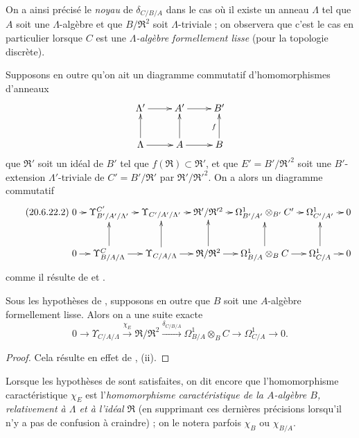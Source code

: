 On a ainsi précisé le \emph{noyau} de $\delta_{C/B/A}$ dans le cas où il
existe un anneau $\Lambda$ tel que $A$ soit une $\Lambda$-algèbre et que
$B/\mathfrak{R}^2$ soit $\Lambda$-triviale ; on observera que c'est le cas
en particulier lorsque $C$ est une \emph{$\Lambda$-algèbre formellement
lisse} (pour la topologie discrète).

Supposons en outre qu'on ait un diagramme commutatif d'homomorphismes
d'anneaux
\[
\xymatrix{
  \Lambda' \ar[r] & A' \ar[r] & B' \\
  \Lambda \ar[u] \ar[r] & A \ar[u] \ar[r] & B \ar[u]^f
}
\]
que $\mathfrak{R}'$ soit un idéal de $B'$ tel que
$f(\mathfrak{R})\subset\mathfrak{R}'$, et que
$E'=B'/\mathfrak{R}'^2$ soit une $B'$-extension $\Lambda'$-triviale de
$C'=B'/\mathfrak{R}'$ par $\mathfrak{R}'/\mathfrak{R}'^2$. On a alors un
diagramme commutatif
\begin{equation}
\tag{20.6.22.2}
\label{0.20.6.22.2-fr}
\xymatrix@C=0.7em{
  0 \ar[r] & \Upsilon^{C'}_{B'/A'/\Lambda'} \ar[r] &
  \Upsilon_{C'/A'/\Lambda'} \ar[r] &
  \mathfrak{R}'/\mathfrak{R}'^2 \ar[r] &
  \Omega^1_{B'/A'}\otimes_{B'} C' \ar[r] &
  \Omega^1_{C'/A'} \ar[r] & 0 \\
  0 \ar[r] & \Upsilon^C_{B/A/\Lambda} \ar[r] \ar[u] &
  \Upsilon_{C/A/\Lambda} \ar[r] \ar[u] &
  \mathfrak{R}/\mathfrak{R}^2 \ar[r] \ar[u] &
  \Omega^1_{B/A}\otimes_B C \ar[r] \ar[u] &
  \Omega^1_{C/A} \ar[r] \ar[u] & 0
}
\end{equation}
comme il résulte de  et .

\begin{corollary}[20.6.23]
\label{0.20.6.23-fr}
Sous les hypothèses de , supposons en outre que $B$ soit
une $A$-algèbre formellement lisse. Alors on a une suite exacte
\begin{equation}
\tag{20.6.23.1}
\label{0.20.6.23.1-fr}
  0\to\Upsilon_{C/A/\Lambda}\xrightarrow{\chi_E}
  \mathfrak{R}/\mathfrak{R}^2\xrightarrow{\delta_{C/B/A}}
  \Omega^1_{B/A}\otimes_B C\to\Omega^1_{C/A}\to0.
\end{equation}
\end{corollary}

\begin{proof}
Cela résulte en effet de , (ii).
\end{proof}

\begin{env}[20.6.24]
\label{0.20.6.24-fr}
Lorsque les hypothèses de  sont satisfaites, on dit encore
que l'homomorphisme caractéristique $\chi_E$ est
l'\emph{homomorphisme caractéristique de la $A$-algèbre $B$, relativement à
$\Lambda$ et à l'idéal $\mathfrak{R}$} (en supprimant ces dernières
précisions lorsqu'il n'y a pas de confusion à craindre) ; on le notera
parfois $\chi_B$ ou $\chi_{B/A}$.
\end{env}

